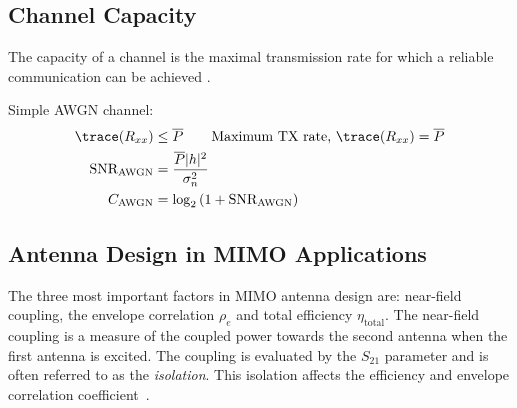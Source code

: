 \subsection{Channel Capacity}
The capacity of a channel is the maximal transmission rate for which a reliable communication can be achieved \cite{Tim2012Practical}.

Simple AWGN channel:
\def\snr{\text{SNR}_{\text{AWGN}}}
\def\PP{\overline{P}}
\def\CC{C_{\text{AWGN}}}
\begin{align*}
    \trace(R_{xx}) &\leq \PP \qquad \text{Maximum TX rate, $\trace(R_{xx})=\PP$}\\
    \snr &= \frac{\PP |h|^2}{\sigma_n^2} \\
    \CC &= \log_2 \left( 1 + \snr \right)
\end{align*}



\subsection{Antenna Design in MIMO Applications}
The three most important factors in MIMO antenna design are: near-field coupling, the envelope correlation $\rho_e$ and total efficiency $\eta_{\text{total}}$. The near-field coupling is a measure of the coupled power towards the second antenna when the first antenna is excited. The coupling is evaluated by the $S_{21}$ parameter and is often referred to as the \emph{isolation}. This isolation affects the efficiency and envelope correlation coefficient~\cite{Tatomirescu2011PortIsolation}. 

